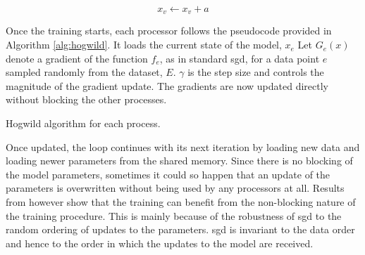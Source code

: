 $$
x_{v} \leftarrow x_{v}+a
$$

Once the training starts, each processor follows the pseudocode provided in Algorithm \ref{alg:hogwild}. It loads the current state of the model, $x_e$
Let $G_{e}(x)$ denote a gradient of the function $f_{e}$, as in standard \acrshort{sgd}, for a data point $e$ sampled randomly from the dataset, $E$. $\gamma$ is the step size and controls the magnitude of the gradient update. The gradients are now updated directly without blocking the other processes.


\begin{algorithm}
\caption{Hogwild algorithm for each process.}\label{alg:hogwild}
\end{algorithm}

Once updated, the loop continues with its next iteration by loading new data and loading newer parameters from the shared memory. Since there is no blocking of the model parameters, sometimes  it could so happen that an update of the parameters is overwritten without being used by any processors at all. Results from \cite{Niu2011HOGWILD:Descent} however show that the training can benefit from the non-blocking nature of the training procedure. This is mainly because of the robustness of \acrshort{sgd} to the random ordering of updates to the parameters. \acrshort{sgd} is invariant to the data order and hence to the order in which the updates to the model are received.

